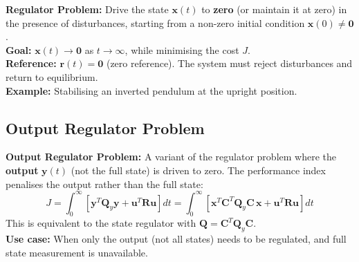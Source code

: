 \documentclass[12pt,a4paper]{article}
\begin{document}
\begin{tcolorbox}[defbox]
\textbf{Regulator Problem:} Drive the state $\mathbf{x}(t)$ to \textbf{zero} (or maintain it at zero) in the presence of disturbances, starting from a non-zero initial condition $\mathbf{x}(0) \neq \mathbf{0}$.\\[4pt]
\textbf{Goal:} $\mathbf{x}(t) \to \mathbf{0}$ as $t \to \infty$, while minimising the cost $J$.\\[4pt]
\textbf{Reference:} $\mathbf{r}(t) = \mathbf{0}$ (zero reference). The system must reject disturbances and return to equilibrium.\\[4pt]
\textbf{Example:} Stabilising an inverted pendulum at the upright position.
\end{tcolorbox}

\begin{tcolorbox}[tikzbox, title={Regulator Problem Block Diagram}]
\centering
{}
\end{tcolorbox}

\subsection{Output Regulator Problem}

\begin{tcolorbox}[defbox]
\textbf{Output Regulator Problem:} A variant of the regulator problem where the \textbf{output} $\mathbf{y}(t)$ (not the full state) is driven to zero. The performance index penalises the output rather than the full state:
$$J = \int_0^{\infty} \left[\mathbf{y}^T\mathbf{Q}_y\mathbf{y} + \mathbf{u}^T\mathbf{R}\mathbf{u}\right] dt = \int_0^{\infty} \left[\mathbf{x}^T\mathbf{C}^T\mathbf{Q}_y\mathbf{C}\,\mathbf{x} + \mathbf{u}^T\mathbf{R}\mathbf{u}\right] dt$$
This is equivalent to the state regulator with $\mathbf{Q} = \mathbf{C}^T\mathbf{Q}_y\mathbf{C}$.\\[4pt]
\textbf{Use case:} When only the output (not all states) needs to be regulated, and full state measurement is unavailable.
\end{tcolorbox}
\end{document}

